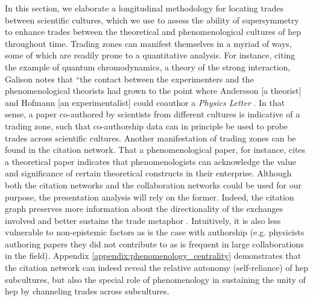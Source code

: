 \documentclass[smallextended]{svjour3}
\begin{document}
In this section, we elaborate a longitudinal methodology for locating trades between scientific cultures, which we use to assess the ability of supersymmetry to enhance trades between the theoretical and phenomenological cultures of \gls{hep} throughout time. Trading zones can manifest themselves in a myriad of ways, some of which are readily prone to a quantitative analysis. %
For instance, citing the example of quantum chromodynamics, a theory of the strong interaction, Galison notes that ``the contact between the experimenters and the phenomenological theorists had grown to the point where Andersson [a theorist] and Hofmann [an experimentalist] could coauthor a \textit{Physics Letter} \citep[p.~655]{galison1997image}. In that sense, a paper co-authored by scientists from different cultures is indicative of a trading zone, such that co-authorship data can in principle be used to probe trades across scientific cultures. Another manifestation of trading zones can be found in the citation network. That a phenomenological paper, for instance, cites a theoretical paper indicates that phenomenologists can acknowledge the value and significance of certain theoretical constructs in their enterprise. Although both the citation networks and the collaboration networks could be used for our purpose, the presentation analysis will rely on the former. Indeed, the citation graph preserves more information about the directionality of the exchanges involved and better sustains the trade metaphor \citep{Yan2013}. Intuitively, it is also less vulnerable to non-epistemic factors as is the case with authorship (e.g. physicists authoring papers they did not contribute to as is frequent in large collaborations in the field). Appendix \ref{appendix:phenomenology_centrality} demonstrates that the citation network can indeed reveal the relative autonomy (self-reliance) of \gls{hep} subcultures, but also the special role of phenomenology in sustaining the unity of \gls{hep} by channeling trades across subcultures.
\end{document}
